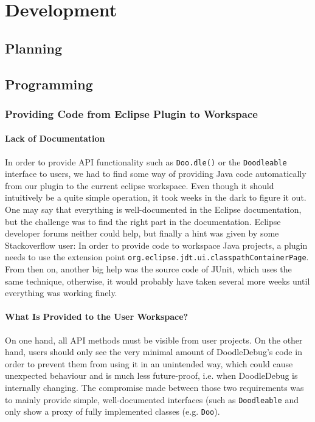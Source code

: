\documentclass{report}
\begin{document}
\chapter*{Development}
\section*{Planning}

\section*{Programming}

\subsection*{Providing Code from Eclipse Plugin to Workspace}
\subsubsection*{Lack of Documentation}
In order to provide API functionality such as \verb-Doo.dle()- or the \verb-Doodleable- interface to users, we had to find some way of providing Java code automatically from our plugin to the current eclipse workspace. Even though it should intuitively be a quite simple operation, it took weeks in the dark to figure it out. One may say that everything is well-documented in the Eclipse documentation, but the challenge was to find the right part in the documentation. Eclipse developer forums neither could help, but finally a hint was given by some Stackoverflow user: In order to provide code to workspace Java projects, a plugin needs to use the extension point \verb-org.eclipse.jdt.ui.classpathContainerPage-. From then on, another big help was the source code of JUnit, which uses the same technique, otherwise, it would probably have taken several more weeks until everything was working finely.
\subsubsection*{What Is Provided to the User Workspace?}
On one hand, all API methods must be visible from user projects. On the other hand, users should only see the very minimal amount of DoodleDebug's code in order to prevent them from using it in an unintended way, which could cause unexpected behaviour and is much less future-proof, i.e. when DoodleDebug is internally changing. The compromise made between those two requirements was to mainly provide simple, well-documented interfaces (such as \verb-Doodleable- and only show a proxy of fully implemented classes (e.g. \verb-Doo-).
\end{document}
